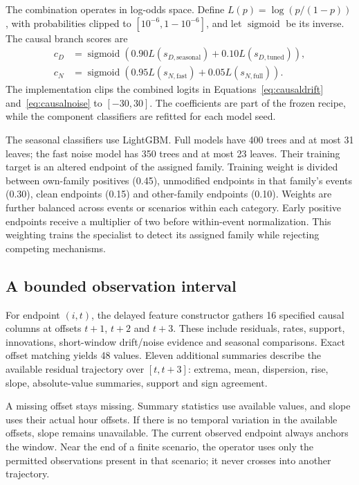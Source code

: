 The combination operates in log-odds space. Define $L(p)=\log(p/(1-p))$, with probabilities clipped to $[10^{-6},1-10^{-6}]$, and let $\operatorname{sigmoid}$ be its inverse. The causal branch scores are
\begin{align}
 c_D&=\operatorname{sigmoid}\left(0.90L(s_{D,\mathrm{seasonal}})
                                  +0.10L(s_{D,\mathrm{tuned}})\right),\label{eq:causaldrift}\\
 c_N&=\operatorname{sigmoid}\left(0.95L(s_{N,\mathrm{fast}})
                                  +0.05L(s_{N,\mathrm{full}})\right).\label{eq:causalnoise}
\end{align}
The implementation clips the combined logits in Equations~\eqref{eq:causaldrift} and~\eqref{eq:causalnoise} to $[-30,30]$. The coefficients are part of the frozen recipe, while the component classifiers are refitted for each model seed.

The seasonal classifiers use LightGBM. Full models have 400 trees and at most 31 leaves; the fast noise model has 350 trees and at most 23 leaves. Their training target is an altered endpoint of the assigned family. Training weight is divided between own-family positives (0.45), unmodified endpoints in that family's events (0.30), clean endpoints (0.15) and other-family endpoints (0.10). Weights are further balanced across events or scenarios within each category. Early positive endpoints receive a multiplier of two before within-event normalization. This weighting trains the specialist to detect its assigned family while rejecting competing mechanisms.

\subsection{A bounded observation interval}
For endpoint $(i,t)$, the delayed feature constructor gathers 16 specified causal columns at offsets $t+1$, $t+2$ and $t+3$. These include residuals, rates, support, innovations, short-window drift/noise evidence and seasonal comparisons. Exact offset matching yields 48 values. Eleven additional summaries describe the available residual trajectory over $[t,t+3]$: extrema, mean, dispersion, rise, slope, absolute-value summaries, support and sign agreement.

A missing offset stays missing. Summary statistics use available values, and slope uses their actual hour offsets. If there is no temporal variation in the available offsets, slope remains unavailable. The current observed endpoint always anchors the window. Near the end of a finite scenario, the operator uses only the permitted observations present in that scenario; it never crosses into another trajectory.

